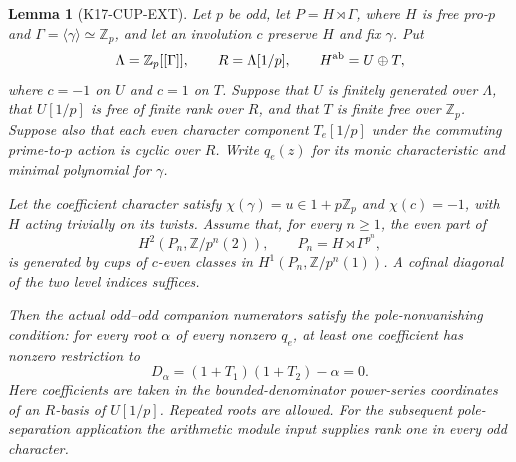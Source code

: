 \documentclass[11pt,a4paper]{article}
\newtheorem{lemma}[theorem]{Lemma}
\theoremstyle{definition}
\begin{document}
\begin{lemma}[K17-CUP-EXT]\label{lem:cup-pole-bridge}
Let $p$ be odd, let $P=H\rtimes\Gamma$, where $H$ is free pro-$p$
and $\Gamma=\langle\gamma\rangle\simeq\mathbb Z_p$, and let an
involution $c$ preserve $H$ and fix $\gamma$. Put
\[
 \Lambda=\mathbb Z_p[[\Gamma]],\qquad R=\Lambda[1/p],\qquad
 H^{\rm ab}=U\oplus T,
\]
where $c=-1$ on $U$ and $c=1$ on $T$. Suppose that $U$ is finitely
generated over $\Lambda$, that $U[1/p]$ is free of finite rank over
$R$, and that $T$ is finite free over $\mathbb Z_p$. Suppose also
that each even character component $T_e[1/p]$ under the commuting
prime-to-$p$ action is cyclic over $R$. Write $q_e(z)$ for its monic
characteristic and minimal polynomial for $\gamma$.

Let the coefficient character satisfy $\chi(\gamma)=u\in1+p\mathbb Z_p$
and $\chi(c)=-1$, with $H$ acting trivially on its twists. Assume that,
for every $n\geq1$, the even part of
\[
 H^2(P_n,\mathbb Z/p^n(2)),\qquad
 P_n=H\rtimes\Gamma^{p^n},
\]
is generated by cups of $c$-even classes in
$H^1(P_n,\mathbb Z/p^n(1))$. A cofinal diagonal of the two level
indices suffices.

Then the actual odd--odd companion numerators satisfy the
pole-nonvanishing condition: for every root $\alpha$ of every
nonzero $q_e$, at least one coefficient has nonzero restriction to
\[
 D_\alpha=(1+T_1)(1+T_2)-\alpha=0.
                                                               \tag{CE.1}
\]
Here coefficients are taken in the bounded-denominator power-series
coordinates of an $R$-basis of $U[1/p]$. Repeated roots are allowed.
For the subsequent pole-separation application the arithmetic module
input supplies rank one in every odd character.
\end{lemma}
\end{document}

